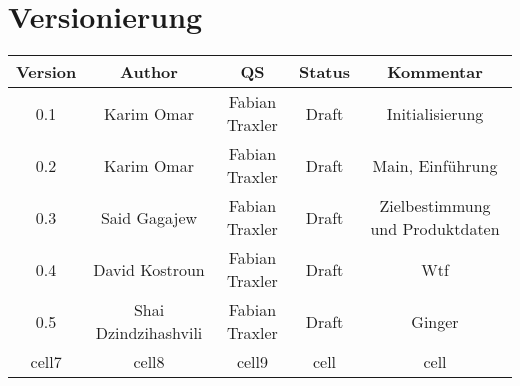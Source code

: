 
\section{Versionierung}

\begin{center}
\begin{tabular}{ |c|c|c|c|c| } 
 \hline
 \textbf{Version} & \textbf{Author} & \textbf{QS} & \textbf{Status} & \textbf{Kommentar} \\ 
 \hline
 0.1 & Karim Omar & Fabian Traxler & Draft & Initialisierung \\ 
 \hline
 0.2 & Karim Omar & Fabian Traxler & Draft & Main, Einführung \\
 \hline
 0.3 & Said Gagajew & Fabian Traxler & Draft & Zielbestimmung und Produktdaten \\
 \hline
 0.4 & David Kostroun & Fabian Traxler & Draft & Wtf \\
 \hline
 0.5 & Shai Dzindzihashvili & Fabian Traxler & Draft & Ginger \\
 \hline
 cell7 & cell8 & cell9 & cell & cell \\ 
 \hline
\end{tabular}
\end{center}

